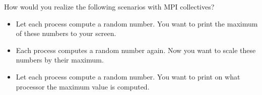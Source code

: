   \label{ex:collective-cases}
  How would you realize the following scenarios with MPI collectives?
  \begin{itemize}
  \item Let each process compute a random number. You want to print the
    maximum of these numbers to your screen.
  \item Each process computes a random number again. Now you want to
    scale these numbers by their maximum.
  \item Let each process compute a random number. You want to print on what processor the
    maximum value is computed.
  \end{itemize}
